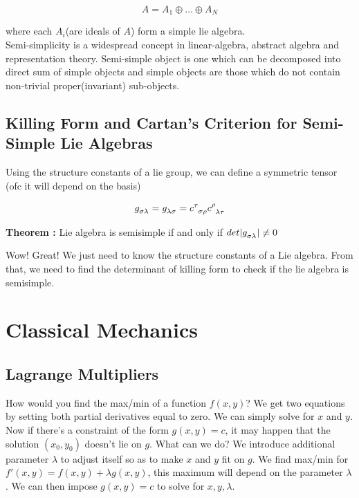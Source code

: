 \documentclass{report}
\begin{document}
$$A = A_1 \oplus \dots \oplus A_N$$

\noindent where each $A_i$(are ideals of $A$) form a simple lie algebra.\\

\noindent Semi-simplicity is a widespread concept in linear-algebra, abstract algebra and representation theory. Semi-simple object is one which can be decomposed into direct sum of simple objects and simple objects are those which do not contain non-trivial proper(invariant) sub-objects.

\section{Killing Form and Cartan's Criterion for Semi-Simple Lie Algebras}

\noindent Using the structure constants of a lie group, we can define a symmetric tensor (ofc it will depend on the basis)

$$g\indices{_ \sigma _\lambda} = g\indices{_\lambda _\sigma} = c\indices{^\tau _\sigma _ \rho}c\indices{^\rho_\lambda_\tau}$$

\noindent\textbf{Theorem :} Lie algebra is semisimple if and only if $det|g\indices{_\sigma_\lambda}| \neq 0$

\noindent Wow! Great! We just need to know the structure constants of a Lie algebra. From that, we need to find the determinant of killing form to check if the lie algebra is semisimple.

\chapter{Classical Mechanics}

\section{Lagrange Multipliers}

How would you find the max/min of a function $f(x,y)$? We get two equations by setting both partial derivatives equal to zero. We can simply solve for $x$ and $y$. Now if there's a constraint of the form $g(x,y)=c$, it may happen that the solution $(x_0,y_0)$ doesn't lie on $g$. What can we do? We introduce additional parameter $\lambda$ to adjust itself so as to make $x$ and $y$ fit on $g$. We find max/min for $f'(x,y)=f(x,y)+\lambda g(x,y)$, this maximum will depend on the parameter $\lambda$. We can then impose $g(x,y)=c$ to solve for $x,y,\lambda$. \\
\end{document}
